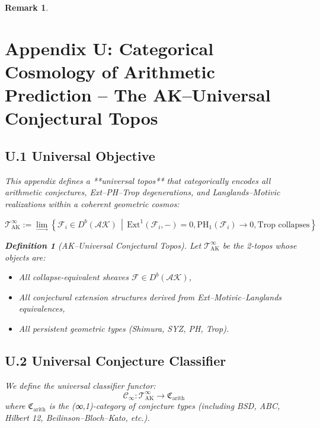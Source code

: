 \documentclass[11pt]{article}
\newtheorem{definition}[theorem]{Definition}
\newtheorem{remark}[theorem]{Remark}
\begin{document}
\begin{remark}

\section*{Appendix U: Categorical Cosmology of Arithmetic Prediction – The AK–Universal Conjectural Topos}

\subsection*{U.1 Universal Objective}

This appendix defines a **universal topos** that categorically encodes all arithmetic conjectures, Ext–PH–Trop degenerations, and Langlands–Motivic realizations within a coherent geometric cosmos:

\[
\boxed{
\mathscr{T}_{\mathrm{AK}}^{\infty} := \lim_{\longrightarrow}
  \left\{
    \mathcal{F}_i \in D^b(\mathcal{AK}) \,\middle|\,
    \mathrm{Ext}^1(\mathcal{F}_i, -) = 0,
    \mathrm{PH}_1(\mathcal{F}_i) \to 0,
    \text{Trop collapses}
  \right\}
}
\]

\begin{definition}[AK–Universal Conjectural Topos]
Let \( \mathscr{T}_{\mathrm{AK}}^{\infty} \) be the 2-topos whose objects are:
\begin{itemize}
  \item All collapse-equivalent sheaves \( \mathcal{F} \in D^b(\mathcal{AK}) \),
  \item All conjectural extension structures derived from Ext–Motivic–Langlands equivalences,
  \item All persistent geometric types (Shimura, SYZ, PH, Trop).
\end{itemize}
\end{definition}

\subsection*{U.2 Universal Conjecture Classifier}

We define the universal classifier functor:
\[
\mathscr{C}_\infty : \mathscr{T}_{\mathrm{AK}}^{\infty} \to \mathfrak{C}_{\mathrm{arith}}
\]
where \( \mathfrak{C}_{\mathrm{arith}} \) is the (∞,1)-category of conjecture types  
(including BSD, ABC, Hilbert 12, Beilinson–Bloch–Kato, etc.).


\end{remark}
\end{document}
